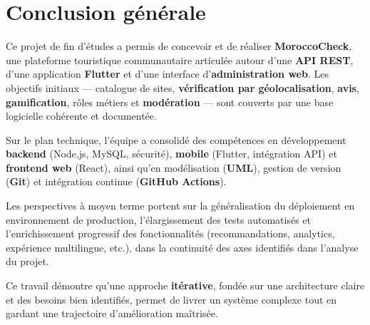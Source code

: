\chapter{Conclusion générale}

Ce projet de fin d'études a permis de concevoir et de réaliser \textbf{MoroccoCheck}, une plateforme touristique communautaire articulée autour d'une \textbf{API REST}, d'une application \textbf{Flutter} et d'une interface d'\textbf{administration web}. Les objectifs initiaux — catalogue de sites, \textbf{vérification par géolocalisation}, \textbf{avis}, \textbf{gamification}, rôles métiers et \textbf{modération} — sont couverts par une base logicielle cohérente et documentée.

Sur le plan technique, l'équipe a consolidé des compétences en développement \textbf{backend} (Node.js, MySQL, sécurité), \textbf{mobile} (Flutter, intégration API) et \textbf{frontend web} (React), ainsi qu'en modélisation (\textbf{UML}), gestion de version (\textbf{Git}) et intégration continue (\textbf{GitHub Actions}).

Les perspectives à moyen terme portent sur la généralisation du déploiement en environnement de production, l'élargissement des tests automatisés et l'enrichissement progressif des fonctionnalités (recommandations, analytics, expérience multilingue, etc.), dans la continuité des axes identifiés dans l'analyse du projet.

Ce travail démontre qu'une approche \textbf{itérative}, fondée sur une architecture claire et des besoins bien identifiés, permet de livrer un système complexe tout en gardant une trajectoire d'amélioration maîtrisée.
